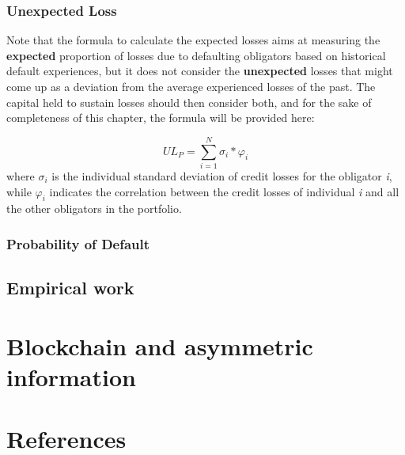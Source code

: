 \documentclass[a4paper,12pt]{article}
\begin{document}
    \subsubsection{Unexpected Loss}
    Note that the formula to calculate the expected losses aims at measuring the \textbf{expected} proportion of losses due to defaulting obligators based on historical default experiences, but 
    it does not consider the \textbf{unexpected} losses that might come up as a deviation from the average experienced losses of the past. The capital held to sustain
    losses should then consider both, and for the sake of completeness of this chapter, the formula will be provided here:

        \begin{equation}
            UL_{P}=\sum_{i=1}^{N} \sigma_{i}*\varphi_{i}
        \end{equation}
        where $\sigma_{i}$ is the individual standard deviation of credit losses for the obligator \textit{i}, while $\varphi_{i}$ indicates the correlation between 
        the credit losses of individual \textit{i} and all the other obligators in the portfolio.

    \subsubsection{Probability of Default}
    
    
    \pagebreak
    \subsection[]{Empirical work}
    

    \pagebreak
    \section{Blockchain and asymmetric information}

    \pagebreak
    \section{References}
\end{document}

